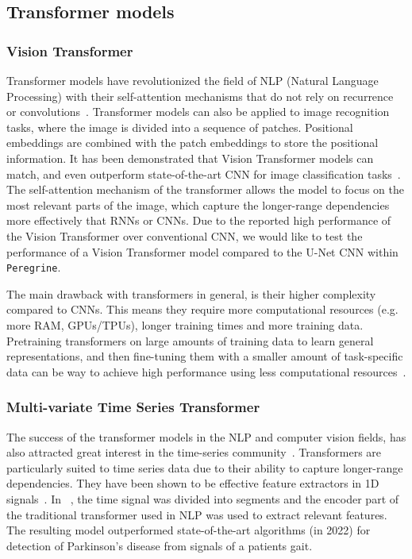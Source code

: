 
\subsection{Transformer models}

\subsubsection{Vision Transformer}

Transformer models have revolutionized the field of NLP (Natural Language Processing) with their self-attention mechanisms that do not rely on recurrence or convolutions~\cite{Vaswani_2017_transformer}. Transformer models can also be applied to image recognition tasks, where the image is divided into a sequence of patches. Positional embeddings are combined with the patch embeddings to store the positional information. It has been demonstrated that Vision Transformer models can match, and even outperform state-of-the-art CNN for image classification tasks~\cite{Dosovitskiy_2021_ViT}. The self-attention mechanism of the transformer allows the model to focus on the most relevant parts of the image, which capture the longer-range dependencies more effectively that RNNs or CNNs. Due to the reported high performance of the Vision Transformer over conventional CNN, we would like to test the performance of a Vision Transformer model compared to the U-Net CNN within \texttt{Peregrine}.

The main drawback with transformers in general, is their higher complexity compared to CNNs. This means they require more computational resources (e.g. more RAM, GPUs/TPUs), longer training times and more training data. Pretraining transformers on large amounts of training data to learn general representations, and then fine-tuning them with a smaller amount of task-specific data can be way to achieve high performance using less computational resources~\cite{Tay_Dehghani_Rao_Fedus_Abnar_Chung_Narang_Yogatama_Vaswani_Metzler_2022}.

\subsubsection{Multi-variate Time Series Transformer}

The success of the transformer models in the NLP and computer vision fields, has also attracted great interest in the time-series community~\cite{Wen_Zhou_Zhang_Chen_Ma_Yan_Sun_2023}. Transformers are particularly suited to time series data due to their ability to capture longer-range dependencies. They have been shown to be effective feature extractors in 1D signals~\cite{Nguyen_Miah_Bilodeau_Bouachir_2022}. In ~\cite{Nguyen_Miah_Bilodeau_Bouachir_2022}, the time signal was divided into segments and the encoder part of the traditional transformer used in NLP was used to extract relevant features. The resulting model outperformed state-of-the-art algorithms (in 2022) for detection of Parkinson's disease from signals of a patients gait. 

